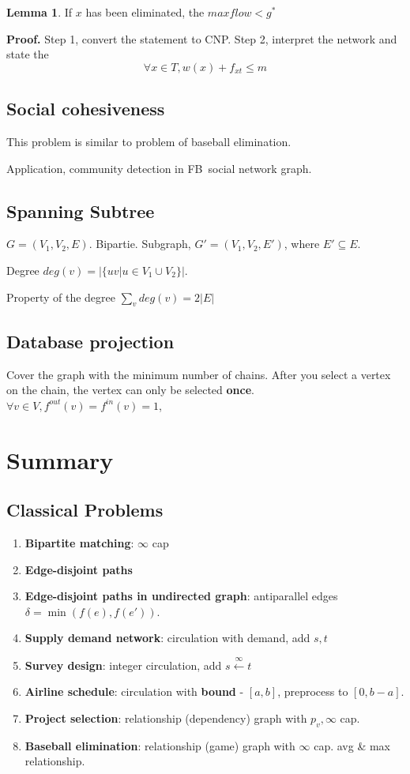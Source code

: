 \documentclass[a4paper]{report}
\theoremstyle{definition}
\newtheorem{lem}{Lemma}[section]
\begin{document}
\begin{lem}
If $x$ has been eliminated, the $maxflow < g^*$
\end{lem}

\textbf{Proof.} Step 1, convert the statement to CNP. Step 2, interpret the network and state the $$\forall x \in T, w(x)+f_{xt}\leq m$$

\subsection{Social cohesiveness}
This problem is similar to problem of baseball elimination.

Application, community detection in FB\ social network graph.

\subsection{Spanning Subtree}
$G=(V_1, V_2, E)$. Bipartie. Subgraph, $G'=(V_1, V_2, E')$, where $E'\subseteq E$.

Degree $deg(v)=|\{uv|u\in V_1\cup V_2\}|$.

Property of the degree $\sum_v deg(v)=2|E|$

\subsection{Database projection}
Cover the graph with the minimum number of chains. After you select a vertex on the chain, the vertex can only be selected \textbf{once}. $\forall v\in V, f^{out}(v)=f^{in}(v)=1$,

\section{Summary}
\subsection{Classical Problems}
\begin{enumerate}
\item \textbf{Bipartite matching}: $\infty$ cap
\item \textbf{Edge-disjoint paths}
\item \textbf{Edge-disjoint paths in undirected graph}: antiparallel edges $\delta = \min(f(e), f(e'))$. 
\item \textbf{Supply demand network}: circulation with demand, add $s, t$
\item \textbf{Survey design}: integer circulation, add $s \overset{\infty}{\leftarrow} t$
\item \textbf{Airline schedule}: circulation with \textbf{bound} - $[a, b]$, preprocess to $[0, b-a]$.
\item \textbf{Project selection}: relationship (dependency) graph with $p_v, \infty$ cap. 
\item \textbf{Baseball elimination}: relationship (game) graph with $\infty$ cap. avg \& max relationship. 
\end{enumerate}
\end{document}
